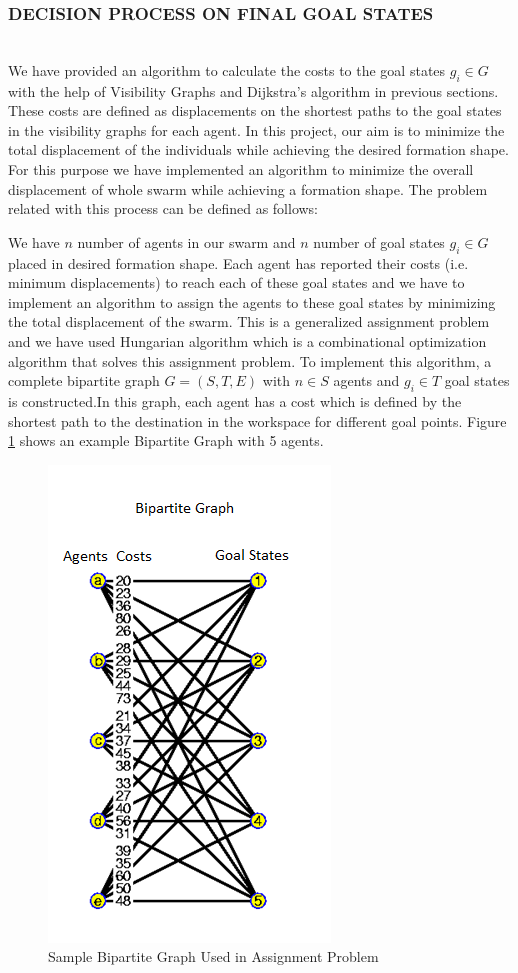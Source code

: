\documentclass[letterpaper, 10 pt, conference]{ieeeconf}  %
\begin{document}
\subsubsection{DECISION PROCESS ON FINAL GOAL STATES}\hspace{0pt} \\
We have provided an algorithm to calculate the costs to the goal states $g_i \in G$ with the help of Visibility Graphs and Dijkstra's algorithm in previous sections. These costs are defined as displacements on the shortest paths to the goal states in the visibility graphs for each agent. In this project, our aim is to minimize the total displacement of the individuals while achieving the desired formation shape. For this purpose we have implemented an algorithm to minimize the overall displacement of whole swarm while achieving a formation shape. The problem related with this process can be defined as follows:

We have $n$ number of agents in our swarm and $n$ number of goal states $g_i \in G$ placed in desired formation shape. Each agent has reported their costs (i.e. minimum displacements) to reach each of these goal states and we have to implement an algorithm to assign the agents to these goal states by minimizing the total displacement of the swarm. This is a generalized assignment problem and we have used Hungarian algorithm which is a combinational optimization algorithm that solves this assignment problem. To implement this algorithm, a complete bipartite graph $G=(S,T,E)$ with $n \in S$ agents and $g_i \in T$ goal states is constructed.In this graph, each agent has a cost which is defined by the shortest path to the destination in the workspace for different goal points. Figure \ref{biprrtti} shows an example Bipartite Graph with 5 agents.

\begin{figure}[thpb]
\centering
\includegraphics[width=.25\textwidth]{bipartite}
\caption{Sample Bipartite Graph Used in Assignment Problem \cite{102}} \label{biprrtti}
\end{figure}
\end{document}
